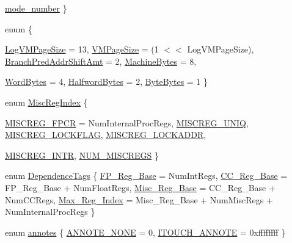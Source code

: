 \begin{DoxyCompactItemize}
\par
\hyperlink{namespaceAlphaISA_a19269c193c0c4866cdc4e5abd433f9fca83ebd1b275cc6ddc8dfea9c58297859b}{mode\_\-number}
 \}
\item 
enum \{ \par
\hyperlink{namespaceAlphaISA_a06fc87d81c62e9abb8790b6e5713c55ba4bf6471bc0cacbced4fb7c20d5b62ed2}{LogVMPageSize} =  13, 
\hyperlink{namespaceAlphaISA_a06fc87d81c62e9abb8790b6e5713c55babe0c83362ff9a394bc07b0e26f089b83}{VMPageSize} =  (1 $<$$<$ LogVMPageSize), 
\hyperlink{namespaceAlphaISA_a06fc87d81c62e9abb8790b6e5713c55bab6e27fddecb5ea8a8f85df1cf2f19698}{BranchPredAddrShiftAmt} =  2, 
\hyperlink{namespaceAlphaISA_a06fc87d81c62e9abb8790b6e5713c55badd93150507c751debeaefa48d8a8cfe5}{MachineBytes} =  8, 
\par
\hyperlink{namespaceAlphaISA_a06fc87d81c62e9abb8790b6e5713c55ba2c71f93071b4020680d196ef87d692be}{WordBytes} =  4, 
\hyperlink{namespaceAlphaISA_a06fc87d81c62e9abb8790b6e5713c55ba2655c394d414a250fb7613c44cd91e11}{HalfwordBytes} =  2, 
\hyperlink{namespaceAlphaISA_a06fc87d81c62e9abb8790b6e5713c55ba99641f26e588b76bc6abc64c745a5f65}{ByteBytes} =  1
 \}
\item 
enum \hyperlink{namespaceAlphaISA_a1e522017e015d4c7efd6b2360143aa67}{MiscRegIndex} \{ \par
\hyperlink{namespaceAlphaISA_a1e522017e015d4c7efd6b2360143aa67a015a601dd43bbdcfc4010fd4b4ab8489}{MISCREG\_\-FPCR} =  NumInternalProcRegs, 
\hyperlink{namespaceAlphaISA_a1e522017e015d4c7efd6b2360143aa67ac7d1563911c3c3cbd38713677fce2991}{MISCREG\_\-UNIQ}, 
\hyperlink{namespaceAlphaISA_a1e522017e015d4c7efd6b2360143aa67a96956bffd04139e669b2dbc923a11b23}{MISCREG\_\-LOCKFLAG}, 
\hyperlink{namespaceAlphaISA_a1e522017e015d4c7efd6b2360143aa67a05801eba9b0b664b274a2fd5d2611fea}{MISCREG\_\-LOCKADDR}, 
\par
\hyperlink{namespaceAlphaISA_a1e522017e015d4c7efd6b2360143aa67a31af5b9c5def1ac9d1b54f60f8e70442}{MISCREG\_\-INTR}, 
\hyperlink{namespaceAlphaISA_a1e522017e015d4c7efd6b2360143aa67a7d1d86545746c83e719e24556985648a}{NUM\_\-MISCREGS}
 \}
\item 
enum \hyperlink{namespaceAlphaISA_a4720195f4575f008ac78181d27db827e}{DependenceTags} \{ \hyperlink{namespaceAlphaISA_a4720195f4575f008ac78181d27db827ea23c089ac23981fe820094e2fc1579bf4}{FP\_\-Reg\_\-Base} =  NumIntRegs, 
\hyperlink{namespaceAlphaISA_a4720195f4575f008ac78181d27db827eae261857dbef59e0d93992a1e2d1fa322}{CC\_\-Reg\_\-Base} =  FP\_\-Reg\_\-Base + NumFloatRegs, 
\hyperlink{namespaceAlphaISA_a4720195f4575f008ac78181d27db827ea0cbf9912f8507e55495a158f1b94f803}{Misc\_\-Reg\_\-Base} =  CC\_\-Reg\_\-Base + NumCCRegs, 
\hyperlink{namespaceAlphaISA_a4720195f4575f008ac78181d27db827ea0693397933007a82bea39457bd7a7151}{Max\_\-Reg\_\-Index} =  Misc\_\-Reg\_\-Base + NumMiscRegs + NumInternalProcRegs
 \}
\item 
enum \hyperlink{namespaceAlphaISA_afe61b52ff986be7551c135c76c5158ed}{annotes} \{ \hyperlink{namespaceAlphaISA_afe61b52ff986be7551c135c76c5158eda80d10f016be1e607c44e9f9614a86c77}{ANNOTE\_\-NONE} =  0, 
\hyperlink{namespaceAlphaISA_afe61b52ff986be7551c135c76c5158edadab3a452d0668d865718dc4c6d912244}{ITOUCH\_\-ANNOTE} =  0xffffffff
 \}
\end{DoxyCompactItemize}
